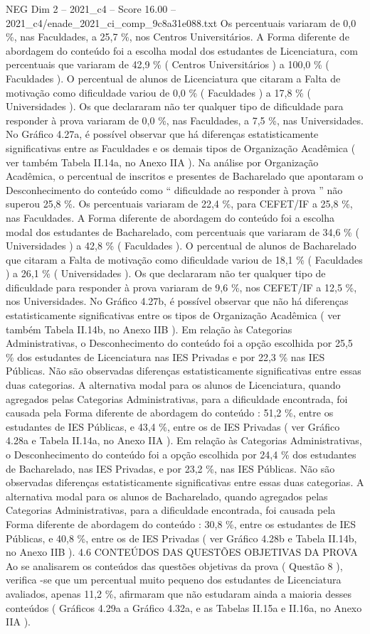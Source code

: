 \begin{textsample}{NEG Dim 2 – 2021\_c4 – Score 16.00 – 2021\_c4/enade\_2021\_ci\_comp\_9c8a31e088.txt}
Os percentuais variaram de 0,0 \%, nas Faculdades, a 25,7 \%, nos Centros Universitários.
A Forma diferente de abordagem do conteúdo foi a escolha modal dos estudantes de Licenciatura, com percentuais que variaram de 42,9 \% ( Centros Universitários ) a 100,0 \% ( Faculdades ).
O percentual de alunos de Licenciatura que citaram a Falta de motivação como dificuldade variou de 0,0 \% ( Faculdades ) a 17,8 \% ( Universidades ).
Os que declararam não ter qualquer tipo de dificuldade para responder à prova variaram de 0,0 \%, nas Faculdades, a 7,5 \%, nas Universidades.
No Gráfico 4.27a, é possível observar que há diferenças estatisticamente significativas entre as Faculdades e os demais tipos de Organização Acadêmica ( ver também Tabela II.14a, no Anexo IIA ).
Na análise por Organização Acadêmica, o percentual de inscritos e presentes de Bacharelado que apontaram o Desconhecimento do conteúdo como “ dificuldade ao responder à prova ” não superou 25,8 \%.
Os percentuais variaram de 22,4 \%, para CEFET/IF a 25,8 \%, nas Faculdades.
A Forma diferente de abordagem do conteúdo foi a escolha modal dos estudantes de Bacharelado, com percentuais que variaram de 34,6 \% ( Universidades ) a 42,8 \% ( Faculdades ).
O percentual de alunos de Bacharelado que citaram a Falta de motivação como dificuldade variou de 18,1 \% ( Faculdades ) a 26,1 \% ( Universidades ).
Os que declararam não ter qualquer tipo de dificuldade para responder à prova variaram de 9,6 \%, nos CEFET/IF a 12,5 \%, nos Universidades.
No Gráfico 4.27b, é possível observar que não há diferenças estatisticamente significativas entre os tipos de Organização Acadêmica ( ver também Tabela II.14b, no Anexo IIB ).
Em relação às Categorias Administrativas, o Desconhecimento do conteúdo foi a opção escolhida por 25,5 \% dos estudantes de Licenciatura nas IES Privadas e por 22,3 \% nas IES Públicas.
Não são observadas diferenças estatisticamente significativas entre essas duas categorias.
A alternativa modal para os alunos de Licenciatura, quando agregados pelas Categorias Administrativas, para a dificuldade encontrada, foi causada pela Forma diferente de abordagem do conteúdo : 51,2 \%, entre os estudantes de IES Públicas, e 43,4 \%, entre os de IES Privadas ( ver Gráfico 4.28a e Tabela II.14a, no Anexo IIA ).
Em relação às Categorias Administrativas, o Desconhecimento do conteúdo foi a opção escolhida por 24,4 \% dos estudantes de Bacharelado, nas IES Privadas, e por 23,2 \%, nas IES Públicas.
Não são observadas diferenças estatisticamente significativas entre essas duas categorias.
A alternativa modal para os alunos de Bacharelado, quando agregados pelas Categorias Administrativas, para a dificuldade encontrada, foi causada pela Forma diferente de abordagem do conteúdo : 30,8 \%, entre os estudantes de IES Públicas, e 40,8 \%, entre os de IES Privadas ( ver Gráfico 4.28b e Tabela II.14b, no Anexo IIB ). 4.6 CONTEÚDOS DAS QUESTÕES OBJETIVAS DA PROVA Ao se analisarem os conteúdos das questões objetivas da prova ( Questão 8 ), verifica -se que um percentual muito pequeno dos estudantes de Licenciatura avaliados, apenas 11,2 \%, afirmaram que não estudaram ainda a maioria desses conteúdos ( Gráficos 4.29a a Gráfico 4.32a, e as Tabelas II.15a e II.16a, no Anexo IIA ).

\end{textsample}
